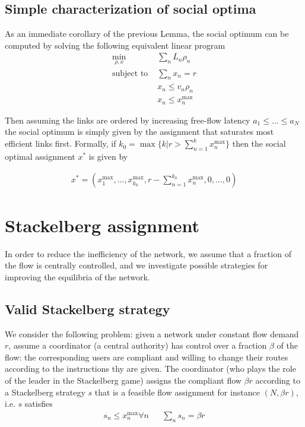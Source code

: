 \subsection{Simple characterization of social optima}
As an immediate corollary of the previous Lemma, the social optimum can be computed by solving the following equivalent linear program
\begin{align*}
\min_{\rho, x}  &\sum_n L_n \rho_n\\
\text{subject to } & 
\sum_n x_n = r\\
& x_n \leq v_n \rho_n\\
& x_n \leq x_n^{\max}
\end{align*}

Then assuming the links are ordered by increasing free-flow latency $a_1 \leq \dots \leq a_N$ the social optimum is simply given by the assignment that saturates most efficient links first. Formally, if $k_0 = \max \{ k | r > \sum_{n = 1}^k x_n^{\max}\}$
then the social optimal assignment $x^*$ is given by

\begin{align}
x^* = (x_1^{\max}, \dots, x_{k_0}^{\max}, r - \sum_{n = 1}^{k_0} x_n^{\max}, 0, \dots, 0)
\end{align}



\newpage
\section{Stackelberg assignment}
In order to reduce the inefficiency of the network, we assume that a fraction of the flow is centrally controlled, and we investigate possible strategies for improving the equilibria of the network. 


\subsection{Valid Stackelberg strategy}
We consider the following problem: given a network under constant flow demand $r$, assume a coordinator (a central authority) has control over a fraction $\beta$ of the flow: the corresponding users are compliant and willing to change their routes according to the instructions thy are given. The coordinator (who plays the role of the leader in the Stackelberg game) assigns the compliant flow $\beta r$ according to a Stackelberg strategy $s$ that is a feasible flow assignment for instance $(N, \beta r)$, i.e. $s$ satisfies
\begin{align*}
s_n \leq x_n^{\max} \forall n && \sum_n s_n = \beta r
\end{align*}

